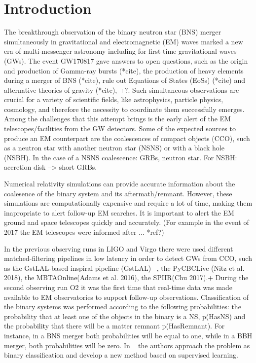 \section{Introduction}


The breakthrough observation of the binary neutron star (BNS) merger simultaneously in gravitational and electromagnetic (EM) waves \cite{LIGOScientific:2017ync} marked a new era of multi-messenger astronomy including for first time gravitational waves (GWs). The event GW170817 gave answers to open questions, such as the origin and production of Gamma-ray bursts (*cite), the production of heavy elements during a merger of BNS (*cite), rule out Equations of States (EoSs) (*cite) and alternative theories of gravity (*cite), +?. Such simultaneous observations are crucial for a variety of scientific fields, like astrophysics, particle physics, cosmology, and therefore the necessity to coordinate them successfully emerges. Among the challenges that this attempt brings is the early alert of the EM telescopes/facilities from the GW detectors. Some of the expected sources to produce an EM counterpart are the coalescences of compact objects (CCO), such as a neutron star with another neutron star (NSNS) or with a black hole (NSBH). In the case of a NSNS coalescence: GRBs, neutron star. For NSBH: accretion disk --> short GRBs.

Numerical relativity simulations can provide accurate information about the coalesence of the binary system and its aftermath/remnant. However, these simulations are computationally expensive and require a lot of time, making them inapropriate to alert follow-up EM searches. It is important to alert the EM ground and space telescopes quickly and accurately. (For example in the event of 2017 the EM telescopes were informed after ... *ref?)


 
In the previous observing runs in LIGO and Virgo there were used different matched-filtering pipelines in low latency in order to detect GWs from CCO, such as the GstLAL-based inspiral pipeline (GstLAL) ~\cite{Sachdev:2020lfd}, the PyCBCLive (Nitz et al. 2018), the MBTAOnline(Adams et al. 2016), the SPIIR(Chu 2017).+ During the second observing run O2 it was the first time that real-time data was made available to EM observatories to support follow-up observations. Classification of the binary systems was performed according to the following probabilities: the probability that at least one of the objects in the binary is a NS, p(HasNS) and the probability that there will be a matter remnant p(HasRemnant). For instance, in a BNS merger both probabilities will be equal to one, while in a BBH merger, both probabilities will be zero. In ~\cite{Chatterjee:2019avs} the authors approach the problem as binary classification and develop a new method based on supervised learning. 


